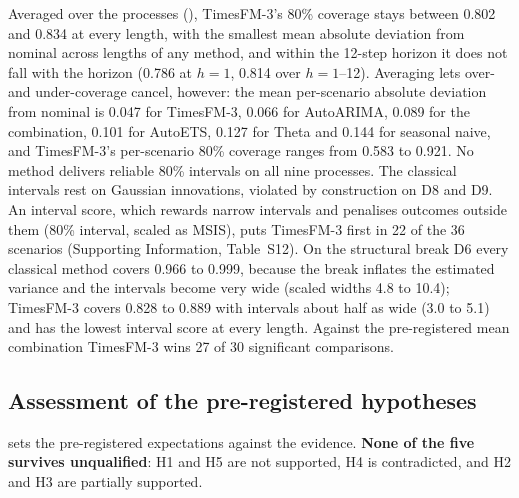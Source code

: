 Averaged over the processes (), TimesFM-3's 80\% coverage stays between 0.802 and
0.834 at every length, with the smallest mean absolute deviation from nominal across lengths of any method, and within the
12-step horizon it does not fall with the horizon (0.786 at $h = 1$, 0.814 over $h = 1$--12). Averaging lets
over- and under-coverage cancel, however: the mean per-scenario absolute deviation from nominal is 0.047 for
TimesFM-3, 0.066 for AutoARIMA, 0.089 for the combination, 0.101 for AutoETS, 0.127 for Theta and 0.144 for
seasonal naive, and TimesFM-3's per-scenario 80\% coverage ranges from 0.583 to 0.921. No method delivers
reliable 80\% intervals on all nine processes. The classical intervals rest on Gaussian innovations,
violated by construction on D8 and D9. An interval score, which rewards narrow intervals and penalises
outcomes outside them (80\% interval, scaled as MSIS), puts TimesFM-3 first in 22 of the 36 scenarios
(Supporting Information, Table~S12). On the structural break D6 every classical method covers 0.966 to
0.999, because the break inflates the estimated variance and the intervals become very wide (scaled widths
4.8 to 10.4); TimesFM-3 covers 0.828 to 0.889 with intervals about half as wide (3.0 to 5.1) and has the
lowest interval score at every length. Against the pre-registered mean combination TimesFM-3 wins 27 of 30
significant comparisons.

\subsection{Assessment of the pre-registered hypotheses}
\label{sec:hypotheses}

 sets the pre-registered expectations against the evidence. \textbf{None of the five
survives unqualified}: H1 and H5 are not supported, H4 is contradicted, and H2 and H3 are partially
supported.

